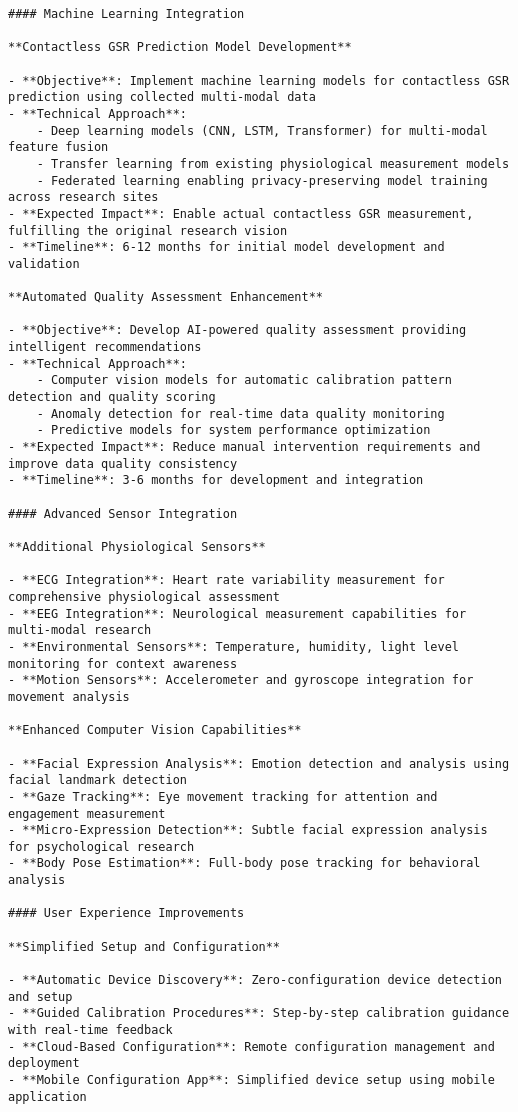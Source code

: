 \documentclass[11pt,a4paper]{report}
\begin{document}
\begin{verbatim}
#### Machine Learning Integration

**Contactless GSR Prediction Model Development**

- **Objective**: Implement machine learning models for contactless GSR prediction using collected multi-modal data
- **Technical Approach**:
    - Deep learning models (CNN, LSTM, Transformer) for multi-modal feature fusion
    - Transfer learning from existing physiological measurement models
    - Federated learning enabling privacy-preserving model training across research sites
- **Expected Impact**: Enable actual contactless GSR measurement, fulfilling the original research vision
- **Timeline**: 6-12 months for initial model development and validation

**Automated Quality Assessment Enhancement**

- **Objective**: Develop AI-powered quality assessment providing intelligent recommendations
- **Technical Approach**:
    - Computer vision models for automatic calibration pattern detection and quality scoring
    - Anomaly detection for real-time data quality monitoring
    - Predictive models for system performance optimization
- **Expected Impact**: Reduce manual intervention requirements and improve data quality consistency
- **Timeline**: 3-6 months for development and integration

#### Advanced Sensor Integration

**Additional Physiological Sensors**

- **ECG Integration**: Heart rate variability measurement for comprehensive physiological assessment
- **EEG Integration**: Neurological measurement capabilities for multi-modal research
- **Environmental Sensors**: Temperature, humidity, light level monitoring for context awareness
- **Motion Sensors**: Accelerometer and gyroscope integration for movement analysis

**Enhanced Computer Vision Capabilities**

- **Facial Expression Analysis**: Emotion detection and analysis using facial landmark detection
- **Gaze Tracking**: Eye movement tracking for attention and engagement measurement
- **Micro-Expression Detection**: Subtle facial expression analysis for psychological research
- **Body Pose Estimation**: Full-body pose tracking for behavioral analysis

#### User Experience Improvements

**Simplified Setup and Configuration**

- **Automatic Device Discovery**: Zero-configuration device detection and setup
- **Guided Calibration Procedures**: Step-by-step calibration guidance with real-time feedback
- **Cloud-Based Configuration**: Remote configuration management and deployment
- **Mobile Configuration App**: Simplified device setup using mobile application


\end{verbatim}
\end{document}
